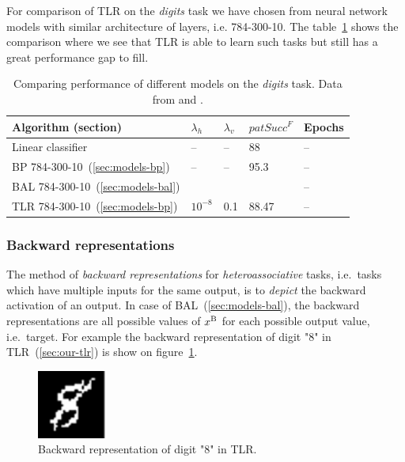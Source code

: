 For comparison of TLR on the \emph{digits} task we have chosen from \citet{digits2014mnist} neural network models with similar architecture of layers, i.e. 784-300-10. The table~\ref{tab:results-cmp-digits} shows the comparison where we see that TLR is able to learn such tasks but still has a great performance gap to fill. 

\begin{table}[H] 
  \centering
    \begin{tabular}{|l|l|l|l|l|}
    \hline
    Algorithm (section)&$\lambda_h$&$\lambda_v$&$patSucc^F$ &Epochs\\ %
    \hline
    Linear classifier & -- & -- & 88 & -- \\ 
    \hline
    BP 784-300-10~(\ref{sec:models-bp})& -- & -- & 95.3 & -- \\ 
    \hline 
    BAL 784-300-10~(\ref{sec:models-bal})& & & & -- \\
    \hline 
    TLR 784-300-10~(\ref{sec:models-bp})& $10^{-8}$ & 0.1 & 88.47 & -- \\
    \hline 
    \end{tabular}
  \caption{Comparing performance of different models on the \emph{digits} task. Data from \citet{lecun1998gradient} and \citet{digits2014mnist}.} 
  \label{tab:results-cmp-digits}
\end{table}

\subsubsection{Backward representations} 
\label{sec:our-backward-repre}

The method of \emph{backward representations} for \emph{heteroassociative} tasks, i.e.~tasks which have multiple inputs for the same output, is to \emph{depict} the backward activation of an output. In case of BAL~(\ref{sec:models-bal}), the backward representations are all possible values of $x^{\rm B}$ for each possible output value, i.e.~target. For example the backward representation of digit "8" in TLR~(\ref{sec:our-tlr}) is show on figure~\ref{fig:our-backward-repre-8}. 

\begin{figure}[H]
  \centering
  \includegraphics[width=0.2\textwidth]{img/tlr-digit-8.png} 
  \caption{Backward representation of digit "8" in TLR.}
  \label{fig:our-backward-repre-8}
\end{figure}

